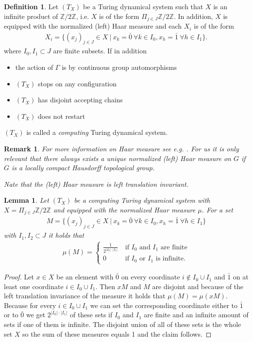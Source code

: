 \documentclass[12pt,a4paper]{scrartcl}
\theoremstyle{plain}
\newtheorem{Lemma}[Theorem]{Lemma}
\newtheorem{Remark}[Theorem]{Remark}
\theoremstyle{definition}
\newtheorem{Definition}[Theorem]{Definition}
\newcommand{\2}{\mathbb{Z} / 2 \mathbb{Z}}
\newcommand{\1}{\bar{1}}
\newcommand{\0}{\bar{0}}
\begin{document}
\begin{Definition}
	Let $(T_X)$ be a Turing dynamical system such that $X$ is an infinite product of $\2$, i.e. $X$ is of the form $ \Pi_{j \in J} \2$. In addition, $X$ is equipped with the normalized (left) Haar measure and each $X_i$ is of the form 
	\begin{align*}
		X_i = \{(x_j)_{j \in J} \in X \ | \ x_k = \0 \ \forall k \in I_0, x_h = \1 \ \forall h \in I_1\}.
	\end{align*}
	where $I_0, I_1 \subset J$ are finite subsets.
	If in addition
	\begin{itemize}
		\item the action of $\Gamma$ is by continuous group automorphisms
		\item $(T_X)$ stops on any configuration
		\item $(T_X)$ has disjoint accepting chains
		\item $(T_X)$ does not restart
	\end{itemize}
	$(T_X)$ is called a \emph{computing} Turing dynamical system.
\end{Definition}
\begin{Remark}
	For more information on Haar measure see e.g. \cite[ch. 2.2]{FOLL}. For us it is only relevant that there always exists a unique normalized (left) Haar measure on $G$ if $G$ is a locally compact Hausdorff topological group.
	
	Nate that the (left) Haar measure is left translation invariant.
\end{Remark}
\begin{Lemma}
	Let $(T_X)$ be a computing Turing dynamical system with $X = \Pi_{j \in J} \2$ and equipped with the normalized Haar measure $\mu$. For a set 
	\begin{align*}
		M = \{(x_j)_{j \in J} \in X \ | \ x_k = \0 \ \forall k \in I_0, x_h = \1 \ \forall h \in I_1 \}
	\end{align*}
	with $I_1, I_2 \subset J$ it holds that
	\begin{align*}
	\mu (M) = \begin{cases}
	\frac{1}{2^{|I_0| \cdot |I_1|}} & ~\text{if $I_0$ and $I_1$ are finite} \\
	0 & ~ \text{if $I_0$ or $I_1$ is infinite.}
	\end{cases}
	\end{align*}
\end{Lemma}
\begin{proof}
	Let $x \in X$ be an element with $\0$ on every coordinate $i \notin I_0 \cup I_1$ and $\1$ on at least one coordinate $i \in I_0 \cup I_1$. Then $xM$ and $M$ are disjoint and because of the left translation invariance of the measure it holds that $\mu (M) = \mu (xM)$. Because for every $i \in I_0 \cup I_1$ we can set the corresponding coordinate either to $\1$ or to $\0$ we get $2^{|I_0| \cdot |I_1|}$ of these sets if $I_0$ and $I_1$ are finite and an infinite amount of sets if one of them is infinite. The disjoint union of all of these sets is the whole set $X$ so the sum of these measures equals 1 and the claim follows.
\end{proof}
 
\end{document}
